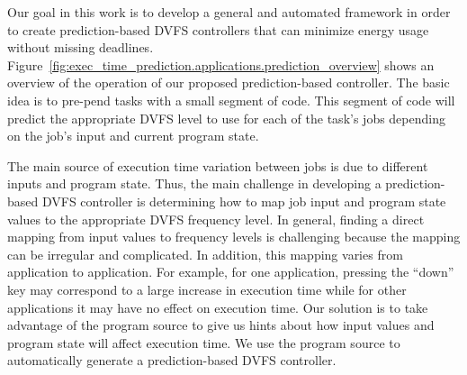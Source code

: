 Our goal in this work is to develop a general and automated framework in order
to create prediction-based DVFS controllers that can minimize energy usage
without missing deadlines.
Figure~\ref{fig:exec_time_prediction.applications.prediction_overview} shows an
overview of the operation of our proposed prediction-based controller. The
basic idea is to pre-pend tasks with a small segment of code. This segment of
code will predict the appropriate DVFS level to use for each of the task's jobs
depending on the job's input and current program state.

The main source of execution time variation between jobs is due to different
inputs and program state. Thus, the main challenge in developing a
prediction-based DVFS controller is determining how to map job input and
program state values to the appropriate DVFS frequency level. In general,
finding a direct mapping from input values to frequency levels is challenging
because the mapping can be irregular and complicated. In addition, this mapping
varies from application to application. For example, for one application,
pressing the ``down'' key may correspond to a large increase in execution time
while for other applications it may have no effect on execution time. Our
solution is to take advantage of the program source to give us hints about how
input values and program state will affect execution time. We use the program
source to automatically generate a prediction-based DVFS controller.


